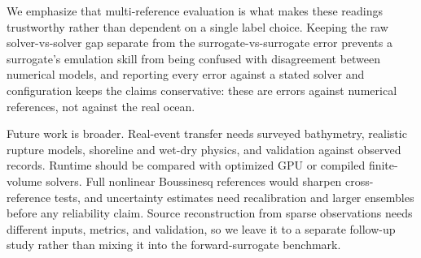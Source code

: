 We emphasize that multi-reference evaluation is what makes these readings trustworthy rather than dependent on a single label choice. Keeping the raw solver-vs-solver gap separate from the surrogate-vs-surrogate error prevents a surrogate's emulation skill from being confused with disagreement between numerical models, and reporting every error against a stated solver and configuration keeps the claims conservative: these are errors against numerical references, not against the real ocean.

Future work is broader. Real-event transfer needs surveyed bathymetry, realistic rupture models, shoreline and wet-dry physics, and validation against observed records. Runtime should be compared with optimized GPU or compiled finite-volume solvers. Full nonlinear Boussinesq references would sharpen cross-reference tests, and uncertainty estimates need recalibration and larger ensembles before any reliability claim. Source reconstruction from sparse observations needs different inputs, metrics, and validation, so we leave it to a separate follow-up study rather than mixing it into the forward-surrogate benchmark.
